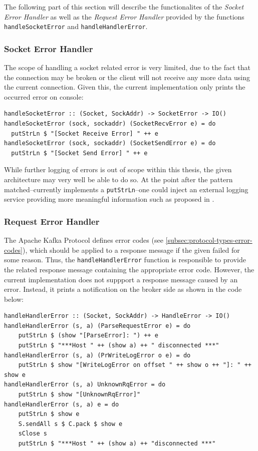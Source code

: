 The following part of this section will describe the functionalites of the
\textit{Socket Error Handler} as well as the \textit{Request Error Handler}
provided by the functions \lstinline{handleSocketError} and
\lstinline{handleHandlerError}.

\subsubsection{Socket Error Handler}

The scope of handling a socket related error is very limited, due to the fact
that the connection may be broken or the client will not receive any more data
using the current connection. Given this, the current implementation only
prints the occurred error on console:

\begin{lstlisting}[caption={Catching error of type SocketError}]
handleSocketError :: (Socket, SockAddr) -> SocketError -> IO()
handleSocketError (sock, sockaddr) (SocketRecvError e) = do
  putStrLn $ "[Socket Receive Error] " ++ e
handleSocketError (sock, sockaddr) (SocketSendError e) = do
  putStrLn $ "[Socket Send Error] " ++ e
\end{lstlisting}

While further logging of errors is out of scope within this thesis, the given
architecture may very well be able to do so. At the point after the pattern
matched--currently implements a \lstinline{putStrLn}--one
could inject an external logging service providing more meaningful information
such as proposed in .

\subsubsection{Request Error Handler}

The Apache Kafka Protocol
defines error codes (see \ref{subsec:protocol-types-error-codes}), which should
be applied to a response message if the given failed for some reason. Thus, the
\lstinline{handleHandlerError} function is responsible to provide the related
response message containing the appropriate error code. However, the current
implementation does not suppport a response message caused by an error. Instead, it
prints a notification on the broker side as shown in the code below:

\begin{lstlisting}[caption={Catching error of type HandleError}]
handleHandlerError :: (Socket, SockAddr) -> HandleError -> IO()
handleHandlerError (s, a) (ParseRequestError e) = do
    putStrLn $ (show "[ParseError]: ") ++ e
    putStrLn $ "***Host " ++ (show a) ++ " disconnected ***"
handleHandlerError (s, a) (PrWriteLogError o e) = do
    putStrLn $ show "[WriteLogError on offset " ++ show o ++ "]: " ++ show e
handleHandlerError (s, a) UnknownRqError = do
    putStrLn $ show "[UnknownRqError]"
handleHandlerError (s, a) e = do
    putStrLn $ show e
    S.sendAll s $ C.pack $ show e
    sClose s
    putStrLn $ "***Host " ++ (show a) ++ "disconnected ***"
\end{lstlisting}


